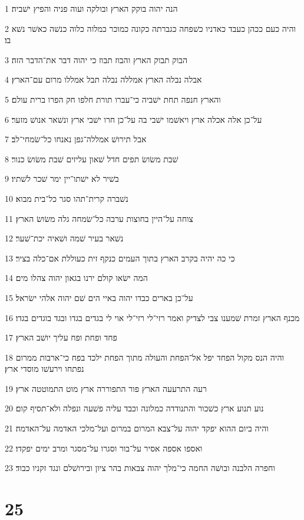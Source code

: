 \par 1 הנה יהוה בוקק הארץ ובולקה ועוה פניה והפיץ ישׁביה׃
\par 2 והיה כעם ככהן כעבד כאדניו כשׁפחה כגברתה כקונה כמוכר כמלוה כלוה כנשׁה כאשׁר נשׁא בו׃
\par 3 הבוק תבוק הארץ והבוז תבוז כי יהוה דבר את־הדבר הזה׃
\par 4 אבלה נבלה הארץ אמללה נבלה תבל אמללו מרום עם־הארץ׃
\par 5 והארץ חנפה תחת ישׁביה כי־עברו תורת חלפו חק הפרו ברית עולם׃
\par 6 על־כן אלה אכלה ארץ ויאשׁמו ישׁבי בה על־כן חרו ישׁבי ארץ ונשׁאר אנושׁ מזער׃
\par 7 אבל תירושׁ אמללה־גפן נאנחו כל־שׂמחי־לב׃
\par 8 שׁבת משׂושׂ תפים חדל שׁאון עליזים שׁבת משׂושׂ כנור׃
\par 9 בשׁיר לא ישׁתו־יין ימר שׁכר לשׁתיו׃
\par 10 נשׁברה קרית־תהו סגר כל־בית מבוא׃
\par 11 צוחה על־היין בחוצות ערבה כל־שׂמחה גלה משׂושׂ הארץ׃
\par 12 נשׁאר בעיר שׁמה ושׁאיה יכת־שׁער׃
\par 13 כי כה יהיה בקרב הארץ בתוך העמים כנקף זית כעוללת אם־כלה בציר׃
\par 14 המה ישׂאו קולם ירנו בגאון יהוה צהלו מים׃
\par 15 על־כן בארים כבדו יהוה באיי הים שׁם יהוה אלהי ישׂראל׃
\par 16 מכנף הארץ זמרת שׁמענו צבי לצדיק ואמר רזי־לי רזי־לי אוי לי בגדים בגדו ובגד בוגדים בגדו׃
\par 17 פחד ופחת ופח עליך יושׁב הארץ׃
\par 18 והיה הנס מקול הפחד יפל אל־הפחת והעולה מתוך הפחת ילכד בפח כי־ארבות ממרום נפתחו וירעשׁו מוסדי ארץ׃
\par 19 רעה התרעעה הארץ פור התפוררה ארץ מוט התמוטטה ארץ׃
\par 20 נוע תנוע ארץ כשׁכור והתנודדה כמלונה וכבד עליה פשׁעה ונפלה ולא־תסיף קום׃
\par 21 והיה ביום ההוא יפקד יהוה על־צבא המרום במרום ועל־מלכי האדמה על־האדמה׃
\par 22 ואספו אספה אסיר על־בור וסגרו על־מסגר ומרב ימים יפקדו׃
\par 23 וחפרה הלבנה ובושׁה החמה כי־מלך יהוה צבאות בהר ציון ובירושׁלם ונגד זקניו כבוד׃

\chapter{25}

